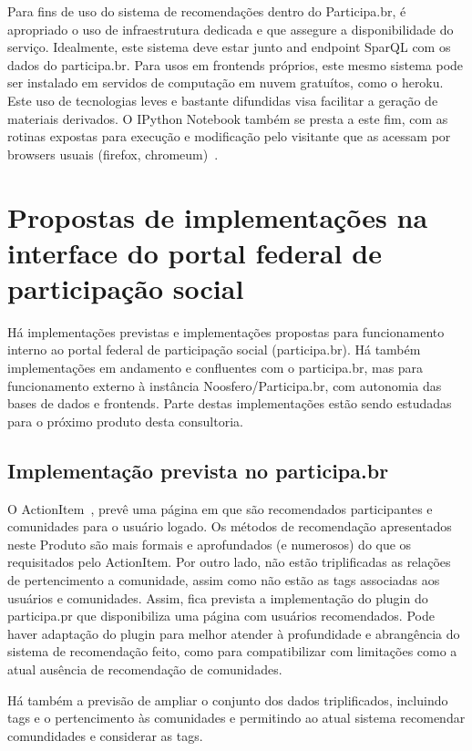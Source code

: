 \documentclass[12pt]{article}
\begin{document}
Para fins de uso do sistema de recomendações dentro do Participa.br, é apropriado o uso de infraestrutura dedicada e que assegure a disponibilidade do serviço. Idealmente, este sistema deve estar junto and endpoint SparQL com os dados do participa.br. Para usos em frontends próprios, este mesmo sistema pode ser instalado em servidos de computação em nuvem gratuítos, como o heroku. Este uso de tecnologias leves e bastante difundidas visa facilitar a geração de materiais derivados. O IPython Notebook também se presta a este fim, com as rotinas expostas para execução e modificação pelo visitante que as acessam por browsers usuais (firefox, chromeum)~\cite{iNotebook}.

\section{Propostas de implementações na interface do portal federal de participação social}\label{sec:acr}
Há implementações previstas e implementações propostas para funcionamento interno ao portal federal de participação social (participa.br). Há também implementações em andamento e confluentes com o participa.br, mas para funcionamento externo à instância Noosfero/Participa.br, com autonomia das bases de dados e frontends. Parte destas implementações estão sendo estudadas para o próximo produto desta consultoria.

\subsection{Implementação prevista no participa.br}
O ActionItem~\cite{actionItem}, prevê uma página em que são recomendados
participantes e comunidades para o usuário logado. Os métodos de recomendação apresentados neste Produto são mais formais e aprofundados (e numerosos) do que os requisitados pelo ActionItem. Por outro lado, não estão triplificadas as relações de pertencimento a comunidade, assim como não estão as tags associadas aos usuários e comunidades. Assim, fica prevista a implementação do plugin do participa.pr que disponibiliza uma página com usuários recomendados. Pode haver adaptação do plugin para melhor atender à profundidade e abrangência do sistema de recomendação feito, como para compatibilizar com limitações como a atual ausência de recomendação de comunidades.

Há também a previsão de ampliar o conjunto dos dados triplificados, incluindo tags e o pertencimento às comunidades e permitindo ao atual sistema recomendar comundidades e considerar as tags.
\end{document}
